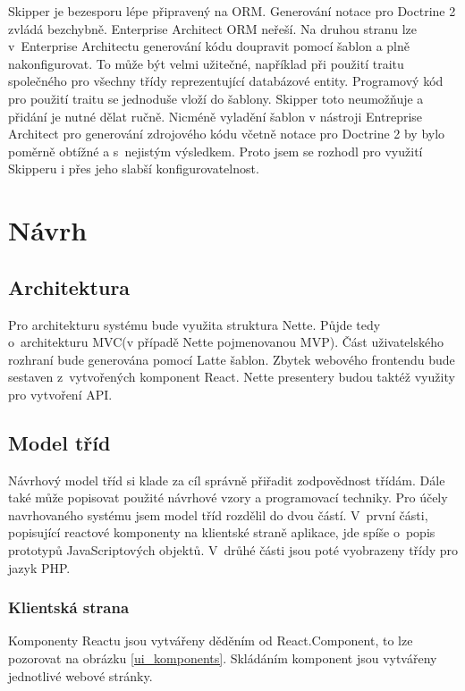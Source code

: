 \documentclass[thesis=B,czech]{FITthesis}[2012/06/26]
\begin{document}
	Skipper je bezesporu lépe připravený na ORM. Generování notace pro Doctrine 2 zvládá bezchybně. Enterprise Architect ORM neřeší. Na druhou stranu lze v~Enterprise Architectu generování kódu doupravit pomocí šablon a plně nakonfigurovat. To může být velmi užitečné, například při použití traitu společného pro všechny třídy reprezentující databázové entity. Programový kód pro použití traitu se jednoduše vloží do šablony. Skipper toto neumožňuje a přidání je nutné dělat ručně. Nicméně vyladění šablon v nástroji Entreprise Architect pro generování zdrojového kódu včetně notace pro Doctrine 2 by bylo poměrně obtížné a s~nejistým výsledkem. Proto jsem se rozhodl pro využití Skipperu i přes jeho slabší konfigurovatelnost.	


\chapter{Návrh}

\section{Architektura}
Pro architekturu systému bude využita struktura Nette. Půjde tedy o~architekturu MVC(v případě Nette pojmenovanou MVP). Část uživatelského rozhraní bude generována pomocí Latte šablon. Zbytek webového frontendu bude sestaven z~vytvořených komponent React. Nette presentery budou taktéž využity pro vytvoření API.

\section{Model tříd}
	Návrhový model tříd si klade za cíl správně přiřadit zodpovědnost třídám. Dále také může popisovat použité návrhové vzory a programovací techniky.\cite{si1_pred6} Pro účely navrhovaného systému jsem model tříd rozdělil do dvou částí. V~první části, popisující reactové komponenty na klientské straně aplikace, jde spíše o~popis prototypů JavaScriptových objektů. V~drůhé části jsou poté vyobrazeny třídy pro jazyk PHP.
	
\subsection{Klientská strana}
	Komponenty Reactu jsou vytvářeny děděním od React.Component, to lze pozorovat na obrázku \ref{ui_komponents}. Skládáním komponent jsou vytvářeny jednotlivé webové stránky.
	
\end{document}
